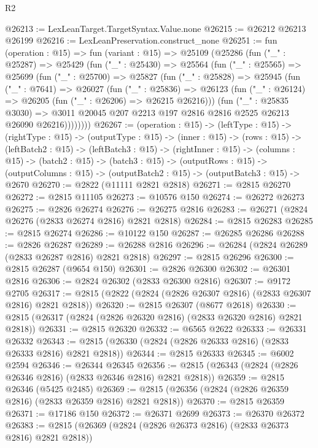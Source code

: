 \begin{lexlean}{R2}
\begin{coremodule}
@26213 := LexLeanTarget.TargetSyntax.Value.none
@26215 := @26212 @26213 @26199
@26216 := LexLeanPreservation.construct_none
@26251 := fun (operation : @15) =>
  fun (variant : @15) =>
  @25109
    (@25286
      (fun ("_" : @25287) =>
      @25429
        (fun ("_" : @25430) =>
        @25564
          (fun ("_" : @25565) =>
          @25699
            (fun ("_" : @25700) =>
            @25827
              (fun ("_" : @25828) =>
              @25945
                (fun ("_" : @7641) =>
                @26027
                  (fun ("_" : @25836) =>
                  @26123 (fun ("_" : @26124) => @26205 (fun ("_" : @26206) => @26215 @26216)))
                  (fun ("_" : @25835 @3030) =>
                  @3011 @20045 @207 @2213 @197 @2816 @2816 @2525 @26213 @26090 @26216))))))))
@26267 := (operation : @15) ->
  (leftType : @15) ->
  (rightType : @15) ->
  (outputType : @15) ->
  (inner : @15) ->
  (rows : @15) ->
  (leftBatch2 : @15) ->
  (leftBatch3 : @15) ->
  (rightInner : @15) ->
  (columns : @15) ->
  (batch2 : @15) ->
  (batch3 : @15) ->
  (outputRows : @15) ->
  (outputColumns : @15) -> (outputBatch2 : @15) -> (outputBatch3 : @15) -> @2670
@26270 := @2822 (@11111 @2821 @2818)
@26271 := @2815 @26270
@26272 := @2815 @11105
@26273 := @10576 @150
@26274 := @26272 @26273
@26275 := @2826 @26274
@26276 := @26275 @2816
@26283 := @26271 (@2824 @26276 (@2833 @26274 @2816) @2821 @2818)
@26284 := @2815 @26283
@26285 := @2815 @26274
@26286 := @10122 @150
@26287 := @26285 @26286
@26288 := @2826 @26287
@26289 := @26288 @2816
@26296 := @26284 (@2824 @26289 (@2833 @26287 @2816) @2821 @2818)
@26297 := @2815 @26296
@26300 := @2815 @26287 (@9654 @150)
@26301 := @2826 @26300
@26302 := @26301 @2816
@26306 := @2824 @26302 (@2833 @26300 @2816)
@26307 := @9172 @2705
@26317 := @2815 (@2822 (@2824 (@2826 @26307 @2816) (@2833 @26307 @2816) @2821 @2818))
@26320 := @2815 @26307 (@8677 @2618)
@26330 := @2815 (@26317 (@2824 (@2826 @26320 @2816) (@2833 @26320 @2816) @2821 @2818))
@26331 := @2815 @26320
@26332 := @6565 @2622
@26333 := @26331 @26332
@26343 := @2815 (@26330 (@2824 (@2826 @26333 @2816) (@2833 @26333 @2816) @2821 @2818))
@26344 := @2815 @26333
@26345 := @6002 @2594
@26346 := @26344 @26345
@26356 := @2815 (@26343 (@2824 (@2826 @26346 @2816) (@2833 @26346 @2816) @2821 @2818))
@26359 := @2815 @26346 (@5425 @2485)
@26369 := @2815 (@26356 (@2824 (@2826 @26359 @2816) (@2833 @26359 @2816) @2821 @2818))
@26370 := @2815 @26359
@26371 := @17186 @150
@26372 := @26371 @2699
@26373 := @26370 @26372
@26383 := @2815 (@26369 (@2824 (@2826 @26373 @2816) (@2833 @26373 @2816) @2821 @2818))

\end{coremodule}
\end{lexlean}
